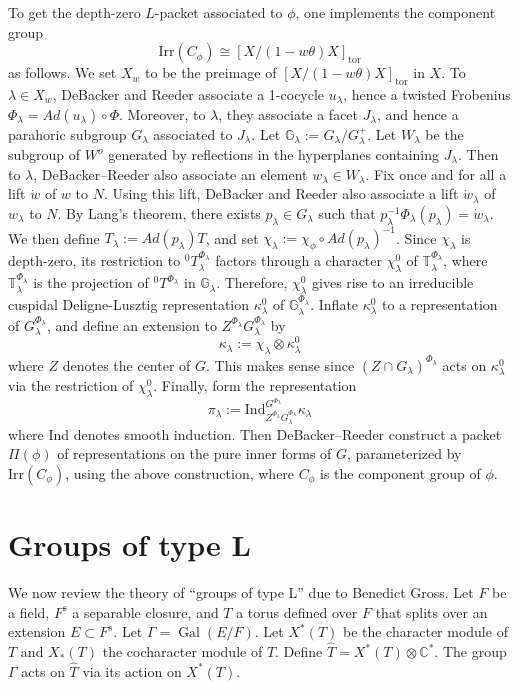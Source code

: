 \documentclass[11pt]{amsart}
\theoremstyle{plain}
\DeclareMathOperator{\Gal}{Gal}
\begin{document}
To get the depth-zero $L$-packet associated to $\phi$, one implements the component group $$\mathrm{Irr}(C_{\phi}) \cong [X / (1 - w \theta) X]_{\mathrm{tor}}$$ as follows. We set $X_w$ to be the preimage of $[X / (1 - w \theta) X]_{\mathrm{tor}}$ in $X$.  To $\lambda \in X_w$, DeBacker and Reeder associate a 1-cocycle $u_{\lambda}$, hence a twisted Frobenius $\Phi_{\lambda} = Ad(u_{\lambda}) \circ \Phi$.  Moreover, to $\lambda$, they associate a facet $J_{\lambda}$, and hence a parahoric subgroup $G_{\lambda}$ associated to $J_{\lambda}$.  Let $\mathbb{G}_{\lambda} := G_{\lambda} / G_{\lambda}^+$.  Let $W_{\lambda}$ be the subgroup of $W^o$ generated by reflections in the hyperplanes containing $J_{\lambda}$.  Then to $\lambda$, DeBacker--Reeder also associate an element $w_{\lambda} \in W_{\lambda}$. Fix once and for all a lift $\dot{w}$ of $w$ to $N$.  Using this lift, DeBacker and Reeder also associate a lift $\dot{w}_{\lambda}$ of $w_{\lambda}$ to $N$. By Lang's theorem, there exists $p_{\lambda} \in G_{\lambda}$ such that $p_{\lambda}^{-1} \Phi_{\lambda} (p_{\lambda}) = \dot{w}_{\lambda}$.  We then define $T_{\lambda} := Ad(p_{\lambda}) T$, and set $\chi_{\lambda} := \chi_{\phi} \circ Ad(p_{\lambda})^{-1}$.  Since $\chi_{\lambda}$ is depth-zero, its restriction to ${}^0 T_{\lambda}^{\Phi_{\lambda}}$ factors through a character $\chi_{\lambda}^0$ of $\mathbb{T}_{\lambda}^{\Phi_{\lambda}}$, where $\mathbb{T}_{\lambda}^{\Phi_{\lambda}}$ is the projection of ${}^0 T^{\Phi_{\lambda}}$ in $\mathbb{G}_{\lambda}$.  Therefore, $\chi_{\lambda}^0$ gives rise to an irreducible cuspidal Deligne-Lusztig representation $\kappa_{\lambda}^0$ of $\mathbb{G}_{\lambda}^{\Phi_{\lambda}}$.  Inflate $\kappa_{\lambda}^0$ to a representation of $G_{\lambda}^{\Phi_{\lambda}}$, and define an extension to $Z^{\Phi_{\lambda}} G_{\lambda}^{\Phi_{\lambda}}$ by $$\kappa_{\lambda} := \chi_{\lambda} \otimes \kappa_{\lambda}^0$$ where $Z$ denotes the center of $G$.  This makes sense since $(Z \cap G_{\lambda})^{\Phi_{\lambda}}$ acts on $\kappa_{\lambda}^0$ via the restriction of $\chi_{\lambda}^0$.  Finally, form the representation $$\pi_{\lambda} := \mathrm{Ind}_{Z^{\Phi_{\lambda}} G_{\lambda}^{\Phi_{\lambda}}}^{G^{\Phi_{\lambda}}} \kappa_{\lambda}$$ where Ind denotes smooth induction.  Then DeBacker--Reeder construct a packet $\Pi(\phi)$ of representations on the pure inner forms of $G$, parameterized by $\mathrm{Irr}(C_{\phi})$, using the above construction, where $C_{\phi}$ is the component group of $\phi$.

\section{Groups of type L}\label{groupsoftypeL}
We now review the theory of ``groups of type L'' due to Benedict Gross.  Let $F$ be a field, $F^{\mathrm s}$ a separable closure, and $T$ a torus defined over $F$ that splits over an extension $E \subset F^s$.
Let $\Gamma = \Gal(E/F)$.  Let $X^*(T)$ be the character module of $T$ and $X_*(T)$ the cocharacter
module of $T$.  Define $\hat{T} = X^*(T) \otimes \mathbb{C}^*$.
The group $\Gamma$ acts on $\hat{T}$ via its action on $X^*(T)$.
\end{document}
